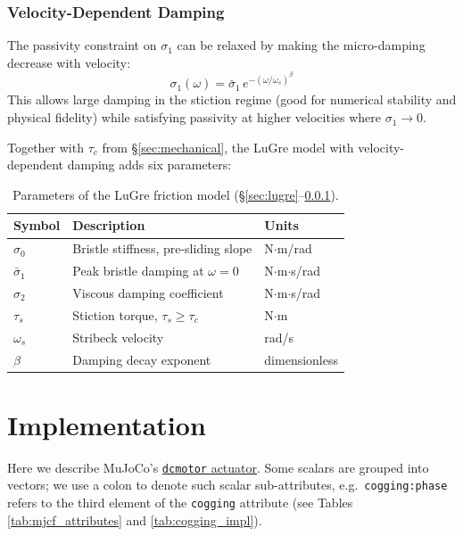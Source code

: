 \documentclass[10pt, a4paper, twocolumn]{article}
\let\oldtexttt\texttt
\renewcommand{\texttt}[1]{{\smaller\oldtexttt{#1}}}
\begin{document}
\subsubsection{Velocity-Dependent Damping}
\label{sec:vel_damping}

The passivity constraint on $\sigma_1$ can be relaxed by making the micro-damping decrease with velocity:
\begin{equation*}
  \sigma_1(\omega) = \bar{\sigma}_1\, e^{-(\omega/\omega_s)^\beta}
  \label{eq:sigma1_vel}
\end{equation*}
This allows large damping in the stiction regime (good for numerical stability and physical fidelity) while satisfying passivity at higher velocities where $\sigma_1 \to 0$.

Together with $\tau_c$ from \S\ref{sec:mechanical}, the LuGre model with velocity-dependent damping adds six parameters:
\begin{table}[H]
\centering
\small
\begin{tabular}{@{}lll@{}}
\toprule
Symbol & Description & Units \\
\midrule
$\sigma_0$ & Bristle stiffness, pre-sliding slope & N$\cdot$m/rad \\
$\bar{\sigma}_1$ & Peak bristle damping at $\omega = 0$ & N$\cdot$m$\cdot$s/rad \\
$\sigma_2$ & Viscous damping coefficient & N$\cdot$m$\cdot$s/rad \\
$\tau_s$ & Stiction torque, $\tau_s \ge \tau_c$ & N$\cdot$m \\
$\omega_s$ & Stribeck velocity & rad/s \\
$\beta$ & Damping decay exponent & dimensionless \\
\bottomrule
\end{tabular}
\caption{Parameters of the LuGre friction model (\S\ref{sec:lugre}--\ref{sec:vel_damping}).}
\label{tab:lugre_params}
\end{table}


\newpage
\section{Implementation}
\label{sec:implementation}

Here we describe MuJoCo's \href{https://mujoco.readthedocs.io/en/stable/XMLreference.html#actuator-dcmotor}{\texttt{dcmotor} actuator}. Some scalars are grouped into vectors; we use a colon to denote such scalar sub-attributes, e.g.\ \texttt{cogging:phase} refers to the third element of the \texttt{cogging} attribute (see Tables \ref{tab:mjcf_attributes} and \ref{tab:cogging_impl}).
\end{document}
